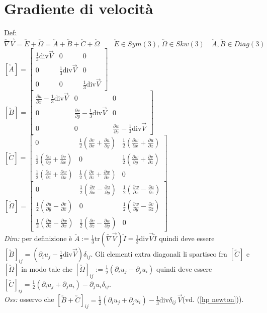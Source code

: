 \documentclass[11pt,a4paper]{report}
\begin{document}
	\section{Gradiente di velocità}	\label{grad vel}
	\underline{Def:} $\utilde\nabla\vec V=\utilde E+\utilde \Omega=\utilde A+\utilde B+\utilde C+\utilde \Omega\qquad \utilde E\in Sym(3),\,\utilde \Omega\in Skw(3)\quad \utilde A,\utilde B\in Diag(3)$\\$
	[\utilde A]=\left[\begin{matrix}
	\frac 13\mathrm{div}\vec V&0&0\\
	0&\frac 13\mathrm{div}\vec V&0\\
	0&0&\frac 13\mathrm{div}\vec V
	\end{matrix}\right]$\qquad$
	[\utilde B]=\left[\begin{matrix}
	\frac{\partial u}{\partial x}-\frac 13\mathrm{div}\vec V&0&0\\
	0&\frac{\partial v}{\partial y}-\frac 13\mathrm{div}\vec V&0\\
	0&0&\frac{\partial w}{\partial z}-\frac 13\mathrm{div}\vec V
	\end{matrix}\right]$\\$
	[\utilde C]=\left[\begin{matrix}
	0&\frac 12(\frac{\partial v}{\partial x}+\frac{\partial u}{\partial y})&\frac 12(\frac{\partial w}{\partial x}+\frac{\partial u}{\partial z})\\
	\frac 12(\frac{\partial u}{\partial y}+\frac{\partial v}{\partial x})&0&\frac 12(\frac{\partial w}{\partial y}+\frac{\partial v}{\partial z})\\
	\frac 12(\frac{\partial u}{\partial z}+\frac{\partial w}{\partial x})&\frac 12(\frac{\partial v}{\partial z}+\frac{\partial w}{\partial x})&0
	\end{matrix}\right]$\qquad$
	[\utilde \Omega]=\left[\begin{matrix}
	0&\frac 12(\frac{\partial v}{\partial x}-\frac{\partial u}{\partial y})&\frac 12(\frac{\partial w}{\partial x}-\frac{\partial u}{\partial z})\\
	\frac 12(\frac{\partial u}{\partial y}-\frac{\partial v}{\partial x})&0&\frac 12(\frac{\partial w}{\partial y}-\frac{\partial v}{\partial z})\\
	\frac 12(\frac{\partial u}{\partial z}-\frac{\partial w}{\partial x})&\frac 12(\frac{\partial v}{\partial z}-\frac{\partial w}{\partial y})&0
	\end{matrix}\right]$\\
	\textit{Dim:} per definizione è $\utilde A:=\frac 13 \mathrm{tr}(\utilde\nabla\vec V)\utilde I=\frac 13\mathrm{div}\vec V\utilde I$ quindi deve essere $[\utilde B]_{ij}=(\partial_iu_j-\frac 13\mathrm{div}\vec V)\delta_{ij}$. Gli elementi extra diagonali li spartisco fra $[\utilde C]$ e $[\utilde \Omega]$ in modo tale che $[\utilde \Omega]_{ij}:=\frac 12(\partial_iu_j-\partial_ju_i)$ quindi deve essere $[\utilde C]_{ij}=\frac 12(\partial_iu_j+\partial_ju_i)-\partial_ju_i\delta_{ij}$.\\
	\textit{Oss:} osservo che $[\utilde B+\utilde C]_{ij}=\frac 12(\partial_iu_j+\partial_ju_i)-\frac 13\mathrm{div}\delta_{ij}\,\vec V$\quad\big(vd. (\ref{hp newton})\big).
	
\end{document}

